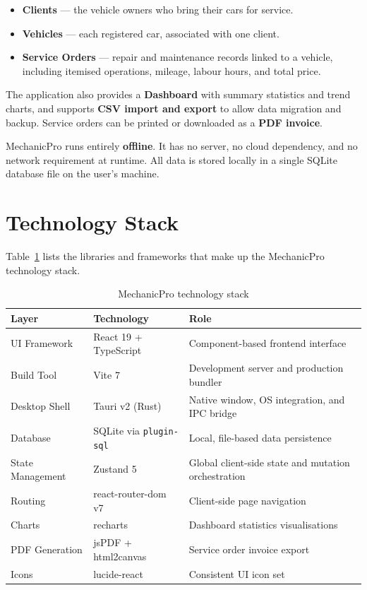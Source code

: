 \documentclass[12pt, a4paper]{report}
\begin{document}
	\begin{itemize}
		\item \textbf{Clients} --- the vehicle owners who bring their cars for service.
		\item \textbf{Vehicles} --- each registered car, associated with one client.
		\item \textbf{Service Orders} --- repair and maintenance records linked to a
		      vehicle, including itemised operations, mileage, labour hours, and total price.
	\end{itemize}

	The application also provides a \textbf{Dashboard} with summary statistics and
	trend charts, and supports \textbf{CSV import and export} to allow data migration
	and backup. Service orders can be printed or downloaded as a \textbf{PDF invoice}.

	MechanicPro runs entirely \textbf{offline}. It has no server, no cloud dependency,
	and no network requirement at runtime. All data is stored locally in a single
	SQLite database file on the user's machine.

	\section{Technology Stack}

	Table~\ref{tab:stack} lists the libraries and frameworks that make up the
	MechanicPro technology stack.

	\begin{table}[H]
		\centering
		\begin{tabularx}{\textwidth}{l l X}
			\toprule
			\textbf{Layer}    & \textbf{Technology}              & \textbf{Role} \\
			\midrule
			UI Framework      & React 19 + TypeScript            & Component-based frontend interface \\
			Build Tool        & Vite 7                           & Development server and production bundler \\
			Desktop Shell     & Tauri v2 (Rust)                  & Native window, OS integration, and IPC bridge \\
			Database          & SQLite via \texttt{plugin-sql}   & Local, file-based data persistence \\
			State Management  & Zustand 5                        & Global client-side state and mutation orchestration \\
			Routing           & react-router-dom v7              & Client-side page navigation \\
			Charts            & recharts                         & Dashboard statistics visualisations \\
			PDF Generation    & jsPDF + html2canvas              & Service order invoice export \\
			Icons             & lucide-react                     & Consistent UI icon set \\
			\bottomrule
		\end{tabularx}
		\caption{MechanicPro technology stack}
		\label{tab:stack}
	\end{table}
\end{document}
